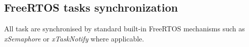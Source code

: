 \subsection{FreeRTOS tasks synchronization}
All task are synchronised by standard built-in FreeRTOS mechanisms such as \emph{xSemaphore} or \emph{xTaskNotify} where applicable.

%
%
%
%
%
%
